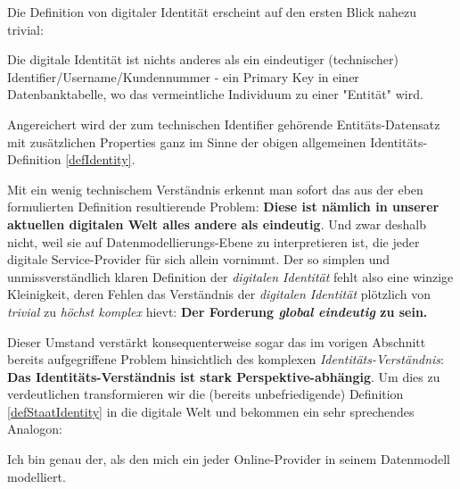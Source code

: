 \vspace{0.2cm}

Die Definition von digitaler Identität erscheint auf den ersten Blick nahezu trivial:

\vspace{0.3cm}

\begin{Business-Def}

Die digitale Identität ist nichts anderes als ein eindeutiger (technischer) Identifier/Username/Kundennummer - ein Primary Key in einer Datenbanktabelle, wo das vermeintliche Individuum zu einer "Entität" wird.

\vspace{0.2cm}

Angereichert wird der zum technischen Identifier gehörende Entitäts-Datensatz mit zusätzlichen Properties ganz im Sinne der obigen allgemeinen Identitäts-Definition \ref{defIdentity}. 

\end{Business-Def}

\vspace{0.3cm}

Mit ein wenig technischem Verständnis erkennt man sofort das aus der eben formulierten Definition resultierende Problem: \textbf{Diese ist nämlich in unserer aktuellen digitalen Welt alles andere als eindeutig}. Und zwar deshalb nicht, weil sie auf Datenmodellierungs-Ebene zu interpretieren ist, die jeder digitale Service-Provider für sich allein vornimmt. Der so simplen und unmissverständlich klaren Definition der \textit{digitalen Identität} fehlt also eine winzige Kleinigkeit, deren Fehlen das Verständnis der \textit{digitalen Identität} plötzlich von \textit{trivial} zu \textit{höchst komplex} hievt: \textbf{Der Forderung \textit{global eindeutig} zu sein.}

Dieser Umstand verstärkt konsequenterweise sogar das im vorigen Abschnitt bereits aufgegriffene Problem hinsichtlich des komplexen \textit{Identitäts-Verständnis}: \textbf{Das Identitäts-Verständnis ist stark Perspektive-abhängig}. Um dies zu verdeutlichen transformieren wir die (bereits unbefriedigende) Definition \ref{defStaatIdentity} in die digitale Welt und bekommen ein sehr sprechendes Analogon:

\vspace{0.3cm}

\begin{Business-Def}[Online-Account = (eine) digitale Identität]\label{defAccount}

Ich bin genau der, als den mich ein jeder Online-Provider in seinem Datenmodell modelliert.

\end{Business-Def}

